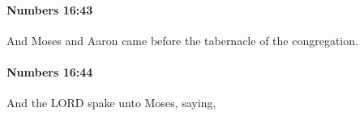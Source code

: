 		\paragraph{Numbers 16:43} %
			\label{NUMBERS-16-43}

			And Moses and Aaron came before the tabernacle of the congregation.


		\paragraph{Numbers 16:44} %
			\label{NUMBERS-16-44}

			And the LORD spake unto Moses, saying,


